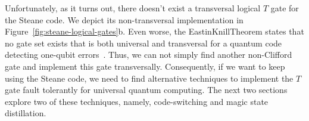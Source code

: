 \noindent
Unfortunately, as it turns out, there doesn't exist a transversal logical $T$ gate for the Steane code. We depict its non-transversal implementation in Figure~\ref{fig:steane-logical-gates}b. Even worse, the Eastin\hyph{}Knill\hyph{}Theorem states that no gate set exists that is both universal and transversal for a quantum code detecting one-qubit errors~\cite{eastin_restrictions_2009}. Thus, we can not simply find another non-Clifford gate and implement this gate transversally. Consequently, if we want to keep using the Steane code, we need to find alternative techniques to implement the $T$ gate fault tolerantly for universal quantum computing. The next two sections explore two of these techniques, namely, code-switching and magic state distillation.